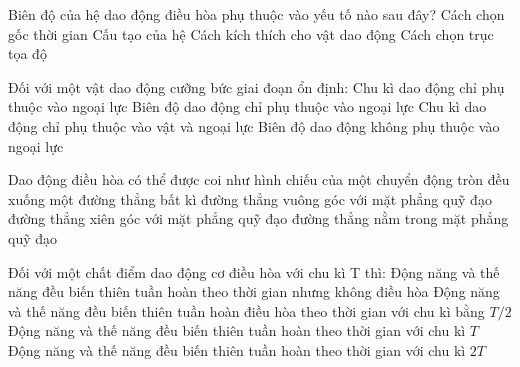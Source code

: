 \begin{ex}	Biên độ của hệ dao động điều hòa phụ thuộc vào yếu tố nào sau đây?
	\choice
	{Cách chọn gốc thời gian}
	{Cấu tạo của hệ}
	{\True Cách kích thích cho vật dao động}
	{Cách chọn trục tọa độ}
\end{ex}

\begin{ex}	Đối với một vật dao động cưỡng bức giai đoạn ổn định:
	\choice
	{\True Chu kì dao động chỉ phụ thuộc vào ngoại lực}
	{Biên độ dao động chỉ phụ thuộc vào ngoại lực}
	{Chu kì dao động chỉ phụ thuộc vào vật và ngoại lực}
	{Biên độ dao động không phụ thuộc vào ngoại lực}
\end{ex}

\begin{ex}	Dao động điều hòa có thể được coi như hình chiếu của một chuyển động tròn đều xuống một
	\choice
	{đường thẳng bất kì}
	{đường thẳng vuông góc với mặt phẳng quỹ đạo}
	{đường thẳng xiên góc với mặt phẳng quỹ đạo}
	{\True đường thẳng nằm trong mặt phẳng quỹ đạo}
\end{ex}

\begin{ex}	Đối với một chất điểm dao động cơ điều hòa với chu kì T thì:
	\choice
	{Động năng và thế năng đều biến thiên tuần hoàn theo thời gian nhưng không điều hòa}
	{\True Động năng và thế năng đều biến thiên tuần hoàn điều hòa theo thời gian với chu kì bằng $T/2$}
	{Động năng và thế năng đều biến thiên tuần hoàn theo thời gian với chu kì $T$}
	{Động năng và thế năng đều biến thiên tuần hoàn theo thời gian với chu kì $2T$}
\end{ex}

